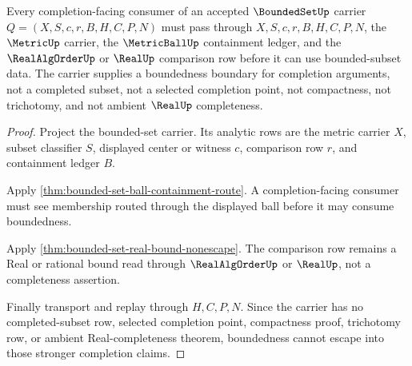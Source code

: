 \begin{theorem}
\label{thm:bounded-set-completion-nonescape}
Every completion-facing consumer of an accepted $\BoundedSetUp$ carrier $Q=(X,S,c,r,B,H,C,P,N)$ must pass through $X,S,c,r,B,H,C,P,N$, the $\MetricUp$ carrier, the $\MetricBallUp$ containment ledger, and the $\RealAlgOrderUp$ or $\RealUp$ comparison row before it can use bounded-subset data. The carrier supplies a boundedness boundary for completion arguments, not a completed subset, not a selected completion point, not compactness, not trichotomy, and not ambient $\RealUp$ completeness.
\end{theorem}
\begin{proof}
Project the bounded-set carrier. Its analytic rows are the metric carrier $X$, subset classifier $S$, displayed center or witness $c$, comparison row $r$, and containment ledger $B$.

Apply \autoref{thm:bounded-set-ball-containment-route}. A completion-facing consumer must see membership routed through the displayed ball before it may consume boundedness.

Apply \autoref{thm:bounded-set-real-bound-nonescape}. The comparison row remains a Real or rational bound read through $\RealAlgOrderUp$ or $\RealUp$, not a completeness assertion.

Finally transport and replay through $H,C,P,N$. Since the carrier has no completed-subset row, selected completion point, compactness proof, trichotomy row, or ambient Real-completeness theorem, boundedness cannot escape into those stronger completion claims.
\end{proof}

